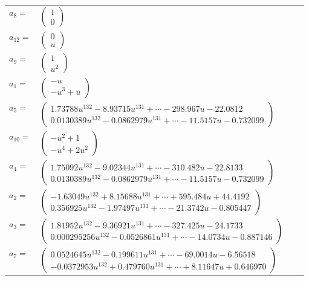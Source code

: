 \documentclass[1p]{elsarticle_modified}
\theoremstyle{definition}
\begin{document}
\begin{tabular}{m{7pt} m{180pt} m{7pt} m{180pt} }
\flushright $a_{8}=$&$\begin{pmatrix}1\\0\end{pmatrix}$ \\
\flushright $a_{12}=$&$\begin{pmatrix}0\\u\end{pmatrix}$ \\
\flushright $a_{9}=$&$\begin{pmatrix}1\\u^2\end{pmatrix}$ \\
\flushright $a_{1}=$&$\begin{pmatrix}- u\\- u^3+u\end{pmatrix}$ \\
\flushright $a_{5}=$&$\begin{pmatrix}1.73788 u^{132}-8.93715 u^{131}+\cdots-298.967 u-22.0812\\0.0130389 u^{132}-0.0862979 u^{131}+\cdots-11.5157 u-0.732099\end{pmatrix}$ \\
\flushright $a_{10}=$&$\begin{pmatrix}- u^2+1\\- u^4+2 u^2\end{pmatrix}$ \\
\flushright $a_{4}=$&$\begin{pmatrix}1.75092 u^{132}-9.02344 u^{131}+\cdots-310.482 u-22.8133\\0.0130389 u^{132}-0.0862979 u^{131}+\cdots-11.5157 u-0.732099\end{pmatrix}$ \\
\flushright $a_{2}=$&$\begin{pmatrix}-1.63049 u^{132}+8.15688 u^{131}+\cdots+595.484 u+44.4192\\0.356925 u^{132}-1.97497 u^{131}+\cdots-21.3742 u-0.805447\end{pmatrix}$ \\
\flushright $a_{3}=$&$\begin{pmatrix}1.81952 u^{132}-9.36921 u^{131}+\cdots-327.425 u-24.1733\\0.000295256 u^{132}-0.0526861 u^{131}+\cdots-14.0734 u-0.887146\end{pmatrix}$ \\
\flushright $a_{7}=$&$\begin{pmatrix}0.0524645 u^{132}-0.199611 u^{131}+\cdots-69.0014 u-6.56518\\-0.0372953 u^{132}+0.479760 u^{131}+\cdots+8.11647 u+0.646970\end{pmatrix}$ \\

\end{tabular}
\end{document}
